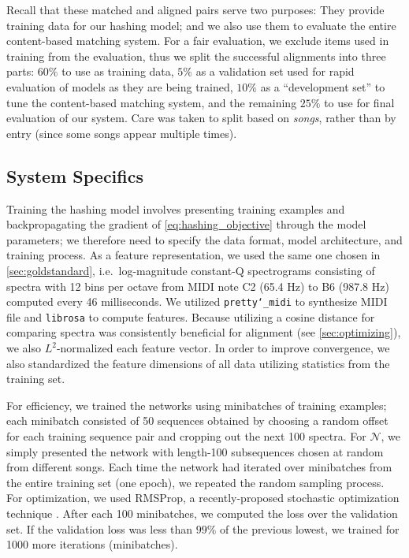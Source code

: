 Recall that these matched and aligned pairs serve two purposes: They provide training data for our hashing model; and we also use them to evaluate the entire content-based matching system.
For a fair evaluation, we exclude items used in training from the evaluation, thus we split the successful alignments into three parts: $60\%$ to use as training data, $5\%$ as a validation set used for rapid evaluation of models as they are being trained, $10\%$ as a ``development set'' to tune the content-based matching system, and the remaining $25\%$ to use for final evaluation of our system.
Care was taken to split based on \textit{songs}, rather than by entry (since some songs appear multiple times).

\subsection{System Specifics}
\label{sec:hashing_system}

Training the hashing model involves presenting training examples and backpropagating the gradient of \cref{eq:hashing_objective} through the model parameters; we therefore need to specify the data format, model architecture, and training process.
As a feature representation, we used the same one chosen in \cref{sec:goldstandard}, i.e.\ log-magnitude constant-Q spectrograms consisting of spectra with 12 bins per octave from MIDI note C2 (65.4 Hz) to B6 (987.8 Hz) computed every 46 milliseconds.
We utilized \texttt{pretty\char`_midi} \cite{raffel2014pretty_midi} to synthesize MIDI file and \texttt{librosa} \cite{mcfee2015librosa, mcfee2015librosa_scipy} to compute features.
Because utilizing a cosine distance for comparing spectra was consistently beneficial for alignment (see \cref{sec:optimizing}), we also $L^2$-normalized each feature vector.
In order to improve convergence, we also standardized the feature dimensions of all data utilizing statistics from the training set.

For efficiency, we trained the networks using minibatches of training examples; each minibatch consisted of 50 sequences obtained by choosing a random offset for each training sequence pair and cropping out the next 100 spectra.
For $\mathcal{N}$, we simply presented the network with length-100 subsequences chosen at random from different songs.
Each time the network had iterated over minibatches from the entire training set (one epoch), we repeated the random sampling process.
For optimization, we used RMSProp, a recently-proposed stochastic optimization technique \cite{tieleman2012lecture}.
After each 100 minibatches, we computed the loss over the validation set.
If the validation loss was less than $99\%$ of the previous lowest, we trained for 1000 more iterations (minibatches).

